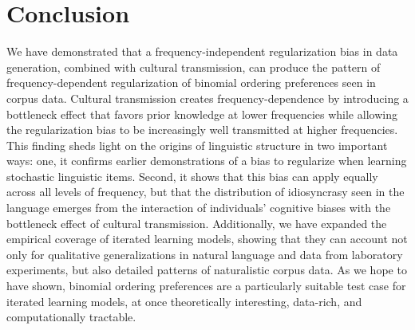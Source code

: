 \documentclass{evolang11}
\begin{document}
\section{Conclusion}
\label{sec:conclusion}
%
We have demonstrated that a frequency-independent regularization bias in data generation, combined with cultural transmission, can produce the pattern of frequency-dependent regularization of binomial ordering preferences seen in corpus data. Cultural transmission creates frequency-dependence by introducing a bottleneck effect that favors prior knowledge at lower frequencies while allowing the regularization bias to be increasingly well transmitted at higher frequencies. This finding sheds light on the origins of linguistic structure in two important ways: one, it confirms earlier demonstrations of a bias to regularize when learning stochastic linguistic items. Second, it shows that this bias can apply equally across all levels of frequency, but that the distribution of idiosyncrasy seen in the language emerges from the interaction of individuals' cognitive biases with the bottleneck effect of cultural transmission. Additionally, we have expanded the empirical coverage of iterated learning models, showing that they can account not only for qualitative generalizations in natural language and data from laboratory experiments, but also detailed patterns of naturalistic corpus data.  As we hope to have shown, binomial ordering preferences are a particularly suitable test case for iterated learning models, at once theoretically interesting, data-rich, and computationally tractable.

%
%  
%
%
%
%  
\end{document}
